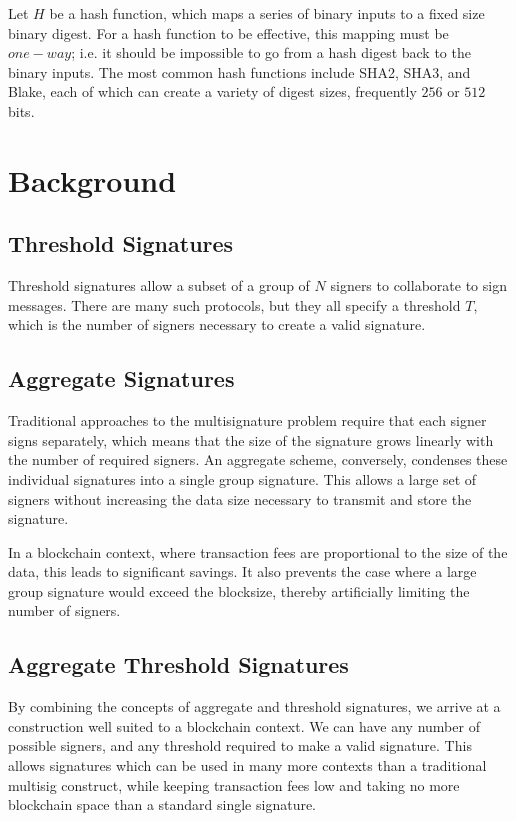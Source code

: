 \documentclass{article}
\begin{document}
Let $H$ be a hash function, which maps a series of binary inputs to a fixed size binary digest.  For a hash function to be effective, this mapping must be $one-way$; i.e. it should be impossible to go from a hash digest back to the binary inputs.  The most common hash functions include SHA2, SHA3, and Blake, each of which can create a variety of digest sizes, frequently $256$ or $512$ bits.

\newpage
\onecolumn
\section{
  Background
}

\subsection{
  Threshold Signatures
}

Threshold signatures allow a subset of a group of $N$ signers to collaborate to sign messages.  There are many such protocols, but they all specify a threshold $T$, which is the number of signers necessary to create a valid signature.  

\subsection{
  Aggregate Signatures
}

Traditional approaches to the multisignature problem require that each signer signs separately, which means that the size of the signature grows linearly with the number of required signers.  An aggregate scheme, conversely, condenses these individual signatures into a single group signature.  This allows a large set of signers without increasing the data size necessary to transmit and store the signature.

In a blockchain context, where transaction fees are proportional to the size of the data, this leads to significant savings.  It also prevents the case where a large group signature would exceed the blocksize, thereby artificially limiting the number of signers.

\subsection{
  Aggregate Threshold Signatures
}

By combining the concepts of aggregate and threshold signatures, we arrive at a construction well suited to a blockchain context.  We can have any number of possible signers, and any threshold required to make a valid signature.  This allows signatures which can be used in many more contexts than a traditional multisig construct, while keeping transaction fees low and taking no more blockchain space than a standard single signature.
\end{document}
